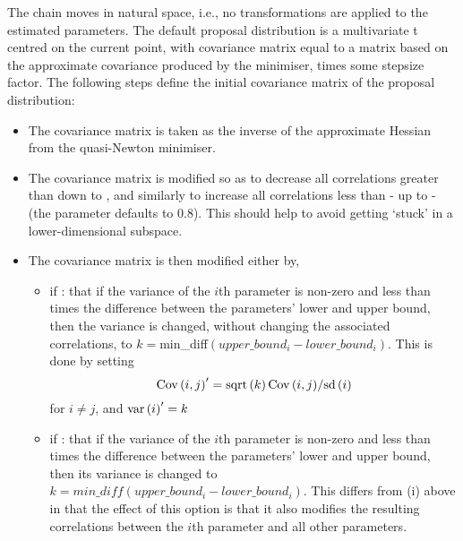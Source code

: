 The chain moves in natural space, i.e., no transformations are applied to the estimated parameters. The default proposal distribution is a multivariate t centred on the current point, with covariance matrix equal to a matrix based on the approximate covariance produced by the minimiser, times some stepsize factor. The following steps define the initial covariance matrix of the proposal distribution: 

\begin{itemize}
\item The covariance matrix is taken as the inverse of the approximate Hessian from the quasi-Newton minimiser.
\item The covariance matrix is modified so as to decrease all correlations greater than  down to , and similarly to increase all correlations less than  - up to - (the  parameter defaults to 0.8). This should help to avoid getting `stuck' in a lower-dimensional subspace.

\item The covariance matrix is then modified either by,

\begin{itemize}
\item if : that if the variance of the $i$th parameter is non-zero and less than  times the difference between the parameters' lower and upper bound, then the variance is changed, without changing the associated correlations, to $k=$min\_diff$(upper\_bound_i-lower\_bound_i)$. This is done by setting \[
{\mathop{\rm Cov}\nolimits} \left( {i,j} \right)^\prime   = {{{\mathop{\rm sqrt}\nolimits} \left( k \right){\mathop{\rm Cov}\nolimits} \left( {i,j} \right)} \mathord{\left/
{\vphantom {{{\mathop{\rm sqrt}\nolimits} \left( k \right){\mathop{\rm Cov}\nolimits} \left( {i,j} \right)} {{\mathop{\rm sd}\nolimits} \left( i \right)}}} \right.
\kern-\nulldelimiterspace} {{\mathop{\rm sd}\nolimits} \left( i \right)}}
\]
for $i \ne j$, and ${\mathop{\rm var}} \left( i \right)^\prime   = k$

\item if : that if the variance of the $i$th parameter is non-zero and less than  times the difference between the parameters' lower and upper bound, then its variance is changed to $k=min\_diff(upper\_bound_i-lower\_bound_i)$. This differs from (i) above in that the effect of this option is that it also modifies the resulting correlations between the $i$th parameter and all other parameters.
\end{itemize}


\end{itemize}
